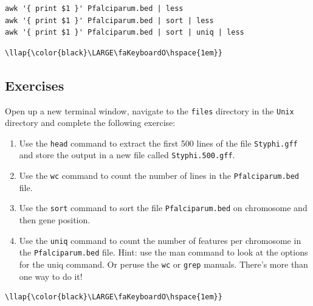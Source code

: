 \documentclass[11pt]{article}
\providecommand{\tightlist}{%
      \setlength{\itemsep}{0pt}\setlength{\parskip}{0pt}}
\begin{document}
\begin{verbatim}
awk '{ print $1 }' Pfalciparum.bed | less
awk '{ print $1 }' Pfalciparum.bed | sort | less
awk '{ print $1 }' Pfalciparum.bed | sort | uniq | less
\end{verbatim}

\begin{terminalinput}
\begin{Verbatim}[commandchars=\\\{\}]
\llap{\color{black}\LARGE\faKeyboardO\hspace{1em}}
\end{Verbatim}
\end{terminalinput}

    \hypertarget{exercises}{%
\subsection{Exercises}\label{exercises}}

Open up a new terminal window, navigate to the \texttt{files} directory
in the \texttt{Unix} directory and complete the following exercise:

\begin{enumerate}
\def\labelenumi{\arabic{enumi}.}
\tightlist
\item
  Use the \texttt{head} command to extract the first 500 lines of the
  file \texttt{Styphi.gff} and store the output in a new file called
  \texttt{Styphi.500.gff}.
\item
  Use the \texttt{wc} command to count the number of lines in the
  \texttt{Pfalciparum.bed} file.
\item
  Use the \texttt{sort} command to sort the file
  \texttt{Pfalciparum.bed} on chromosome and then gene position.
\item
  Use the \texttt{uniq} command to count the number of features per
  chromosome in the \texttt{Pfalciparum.bed} file. Hint: use the man
  command to look at the options for the uniq command. Or peruse the
  \texttt{wc} or \texttt{grep} manuals. There's more than one way to do
  it!
\end{enumerate}

\begin{terminalinput}
\begin{Verbatim}[commandchars=\\\{\}]
\llap{\color{black}\LARGE\faKeyboardO\hspace{1em}}
\end{Verbatim}
\end{terminalinput}
\end{document}
